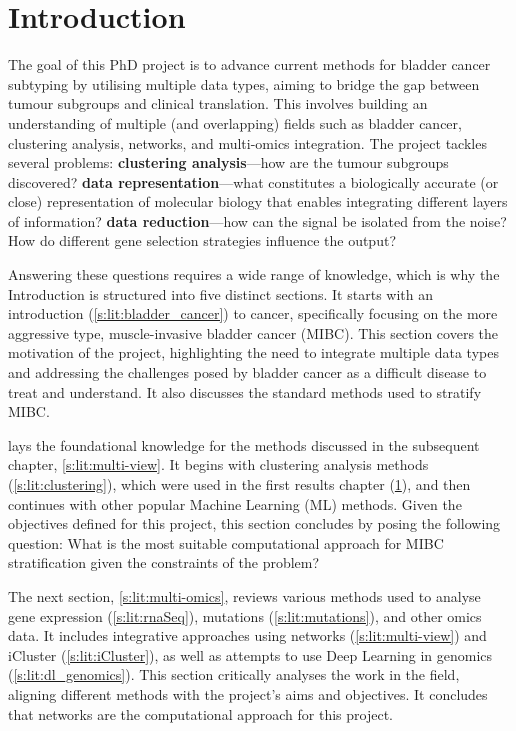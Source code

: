 

\section{Introduction}


The goal of this PhD project is to advance current methods for bladder cancer subtyping by utilising multiple data types, aiming to bridge the gap between tumour subgroups and clinical translation. This involves building an understanding of multiple (and overlapping) fields such as bladder cancer, clustering analysis, networks, and multi-omics integration. The project tackles several problems: \textbf{clustering analysis}—how are the tumour subgroups discovered? \textbf{data representation}—what constitutes a biologically accurate (or close) representation of molecular biology that enables integrating different layers of information? \textbf{data reduction}—how can the signal be isolated from the noise? How do different gene selection strategies influence the output?

Answering these questions requires a wide range of knowledge, which is why the Introduction is structured into five distinct sections. It starts with an introduction (\cref{s:lit:bladder_cancer}) to cancer, specifically focusing on the more aggressive type, muscle-invasive bladder cancer (MIBC). This section covers the motivation of the project, highlighting the need to integrate multiple data types and addressing the challenges posed by bladder cancer as a difficult disease to treat and understand. It also discusses the standard methods used to stratify MIBC.

 lays the foundational knowledge for the methods discussed in the subsequent chapter, \cref{s:lit:multi-view}. It begins with clustering analysis methods (\cref{s:lit:clustering}), which were used in the first results chapter (\ref{}), and then continues with other popular Machine Learning (ML) methods. Given the objectives defined for this project, this section concludes by posing the following question: What is the most suitable computational approach for MIBC stratification given the constraints of the problem?

The next section, \cref{s:lit:multi-omics}, reviews various methods used to analyse gene expression (\cref{s:lit:rnaSeq}), mutations (\cref{s:lit:mutations}), and other omics data. It includes integrative approaches using networks (\cref{s:lit:multi-view}) and iCluster (\cref{s:lit:iCluster}), as well as attempts to use Deep Learning in genomics (\cref{s:lit:dl_genomics}). This section critically analyses the work in the field, aligning different methods with the project's aims and objectives. It concludes that networks are the computational approach for this project.

